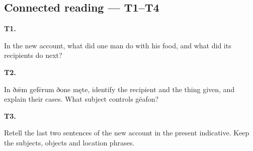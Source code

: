 \par\begin{minipage}{\linewidth}\raggedright
{}
\end{minipage}\par

\subsection*{Connected reading — T1–T4}

\par\begin{minipage}{\linewidth}\raggedright
\textbf{T1.}

In the new account, what did one man do with his food, and what did its recipients do next?

\end{minipage}\par\addvspace{4pt}

\par\begin{minipage}{\linewidth}\raggedright
\textbf{T2.}

In ðǣm gefērum ðone męte, identify the recipient and the thing given, and explain their cases. What subject controls gēafon?

\end{minipage}\par\addvspace{4pt}

\par\begin{minipage}{\linewidth}\raggedright
\textbf{T3.}

Retell the last two sentences of the new account in the present indicative. Keep the subjects, objects and location phrases.

\end{minipage}\par\addvspace{4pt}

